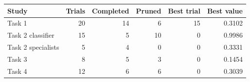 \begin{tabular}{lrrrrr}
\toprule
Study & Trials & Completed & Pruned & Best trial & Best value \\
\midrule
Task 1 & 20 & 14 & 6 & 15 & 0.3102 \\
Task 2 classifier & 15 & 5 & 10 & 0 & 0.9986 \\
Task 2 specialists & 5 & 4 & 0 & 0 & 0.3331 \\
Task 3 & 8 & 5 & 3 & 0 & 0.1454 \\
Task 4 & 12 & 6 & 6 & 0 & 0.3039 \\
\bottomrule
\end{tabular}

